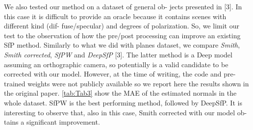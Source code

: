 \documentclass[letterpaper, 6 pt, journal, twoside]{IEEEtran}
\begin{document}
    We also tested our method on a dataset of general ob-
jects presented in [3]. In this case it is difficult to provide an
oracle because it contains scenes with different kind (dif-
fuse/specular) and degrees of polarization. So, we limit
our test to the observation of how the pre/post processing
can improve an existing SfP method. Similarly to what we
did with planes dataset, we compare \textit{Smith}, \textit{Smith corrected},
\textit{SfPW} and \textit{DeepSfP} [3]. The latter method is a Deep model
assuming an orthographic camera, so potentially is a valid
candidate to be corrected with our model. However, at the
time of writing, the code and pre-trained weights were not
publicly available so we report here the results shown in
the original paper. \cref{tab:Tab3} show the MAE of the estimated
normals in the whole dataset. SfPW is the best performing
method, followed by DeepSfP. It is interesting to observe
that, also in this case, Smith corrected with our model ob-
tains a significant improvement.
{\small


}
\end{document}
